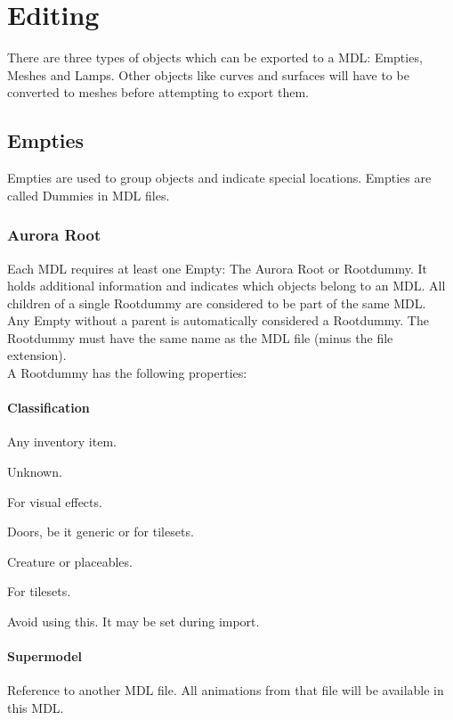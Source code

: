 \chapter{Editing}
There are three types of objects which can be exported to a MDL: Empties,
Meshes and Lamps. Other objects like curves and surfaces will have to be
converted to meshes before attempting to export them.

\section{Empties}
Empties are used to group objects and indicate special 
locations. Empties are called Dummies in MDL files.


\subsection{Aurora Root}
Each MDL requires at least one Empty: The Aurora Root or Rootdummy. It holds 
additional information and indicates which objects belong to an MDL. All children
of a single Rootdummy are considered to be part of the same MDL. \\

Any Empty without a parent is automatically considered a Rootdummy. 
The Rootdummy must have the same name as the MDL file (minus the file extension). \\

A Rootdummy has the following properties:
\subsubsection*{Classification}

\begin{description}[leftmargin=6em,style=nextline]
    \item[Item] Any inventory item.
    \item[GUI] Unknown.
    \item[Effect] For visual effects.
    \item[Door] Doors, be it generic or for tilesets.
    \item[Character] Creature or placeables. 
    \item[Tile] For tilesets.
    \item[Unknown] Avoid using this. It may be set during import.
\end{description}

\subsubsection*{Supermodel}
Reference to another MDL file. All animations from that file 
will be available in this MDL.

